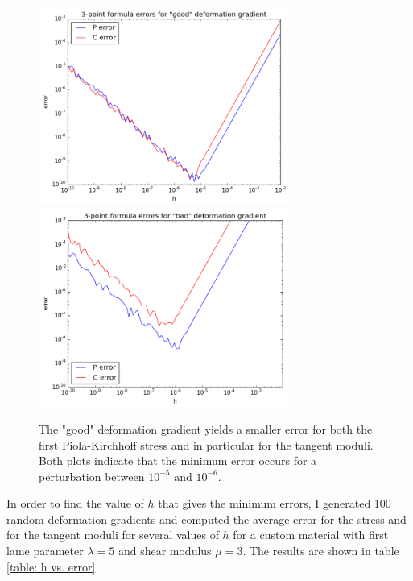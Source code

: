 \documentclass[]{spie}  %
\begin{document}
\begin{figure}[h]
\centering
\includegraphics[width=3.25in]{error_good_F.png} \quad
\includegraphics[width=3.25in]{error_bad_F.png} 
\caption{The "good" deformation gradient yields a smaller error for both the first Piola-Kirchhoff stress and in particular for the tangent moduli. Both plots indicate that the minimum error occurs for a perturbation between $10^{-5}$ and $10^{-6}$.} 
\label{fig: numerical differentiation error}
\end{figure}

In order to find the value of $h$ that gives the minimum errors, I generated 100 random deformation gradients and computed the average error for the stress and for the tangent moduli for several values of $h$ for a custom material with first lame parameter $\lambda = 5$ and shear modulus $\mu = 3$. The results are shown in table \ref{table: h vs. error}.
\end{document}
